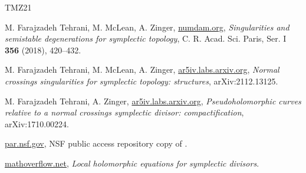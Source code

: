 \documentclass[11pt]{article}
\theoremstyle{remark}
\begin{document}
\begin{thebibliography}{TMZ21}

M. Farajzadeh Tehrani, M. McLean, A. Zinger,
\href{https://www.numdam.org/item/10.1016/j.crma.2018.02.009.pdf}{numdam.org},
\textit{Singularities and semistable degenerations for symplectic topology},
C. R. Acad. Sci. Paris, Ser. I \textbf{356} (2018), 420--432.

M. Farajzadeh Tehrani, M. McLean, A. Zinger,
\href{https://ar5iv.labs.arxiv.org/html/2112.13125}{ar5iv.labs.arxiv.org},
\textit{Normal crossings singularities for symplectic topology: structures},
arXiv:2112.13125.

M. Farajzadeh Tehrani, A. Zinger,
\href{https://ar5iv.labs.arxiv.org/html/1710.00224}{ar5iv.labs.arxiv.org},
\textit{Pseudoholomorphic curves relative to a normal crossings symplectic divisor: compactification},
arXiv:1710.00224.

\href{https://par.nsf.gov/servlets/purl/10430629}{par.nsf.gov},
NSF public access repository copy of \cite{TMZ18}.

\href{https://mathoverflow.net/questions/154302/local-holomorphic-equations-for-symplectic-divisors}{mathoverflow.net},
\textit{Local holomorphic equations for symplectic divisors}.

\end{thebibliography}
\end{document}
